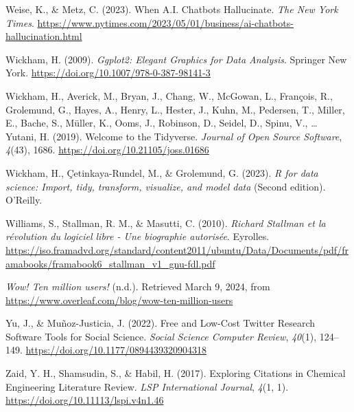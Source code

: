 \documentclass[
  letterpaper,
  DIV=11,
  numbers=noendperiod]{scrreprt}
\newlength{\cslhangindent}
\newenvironment{CSLReferences}[2] %
 {\begin{list}{}{%
  \setlength{\itemindent}{0pt}
  \setlength{\leftmargin}{0pt}
  \setlength{\parsep}{0pt}
  \ifodd #1
   \setlength{\leftmargin}{\cslhangindent}
   \setlength{\itemindent}{-1\cslhangindent}
  \fi
  \setlength{\itemsep}{#2\baselineskip}}}
 {\end{list}}
\begin{document}
\begin{CSLReferences}{1}{0}
Weise, K., \& Metz, C. (2023). When {A}.{I}. {Chatbots Hallucinate}.
\emph{The New York Times}.
\url{https://www.nytimes.com/2023/05/01/business/ai-chatbots-hallucination.html}

Wickham, H. (2009). \emph{Ggplot2: {Elegant Graphics} for {Data
Analysis}}. Springer New York.
\url{https://doi.org/10.1007/978-0-387-98141-3}

Wickham, H., Averick, M., Bryan, J., Chang, W., McGowan, L., François,
R., Grolemund, G., Hayes, A., Henry, L., Hester, J., Kuhn, M., Pedersen,
T., Miller, E., Bache, S., Müller, K., Ooms, J., Robinson, D., Seidel,
D., Spinu, V., \ldots{} Yutani, H. (2019). Welcome to the {Tidyverse}.
\emph{Journal of Open Source Software}, \emph{4}(43), 1686.
\url{https://doi.org/10.21105/joss.01686}

Wickham, H., Çetinkaya-Rundel, M., \& Grolemund, G. (2023). \emph{R for
data science: Import, tidy, transform, visualize, and model data}
(Second edition). O'Reilly.

Williams, S., Stallman, R. M., \& Masutti, C. (2010). \emph{Richard
Stallman et la révolution du logiciel libre - Une biographie autorisée}.
Eyrolles.
\url{https://iso.framadvd.org/standard/content2011/ubuntu/Data/Documents/pdf/framabooks/framabook6_stallman_v1_gnu-fdl.pdf}

\emph{Wow! {Ten} million users!} (n.d.). Retrieved March 9, 2024, from
\url{https://www.overleaf.com/blog/wow-ten-million-users}

Yu, J., \& Muñoz-Justicia, J. (2022). Free and {Low-Cost Twitter
Research Software Tools} for {Social Science}. \emph{Social Science
Computer Review}, \emph{40}(1), 124--149.
\url{https://doi.org/10.1177/0894439320904318}

Zaid, Y. H., Shamsudin, S., \& Habil, H. (2017). Exploring {Citations}
in {Chemical Engineering Literature Review}. \emph{LSP International
Journal}, \emph{4}(1, 1). \url{https://doi.org/10.11113/lspi.v4n1.46}

\end{CSLReferences}
\end{document}
